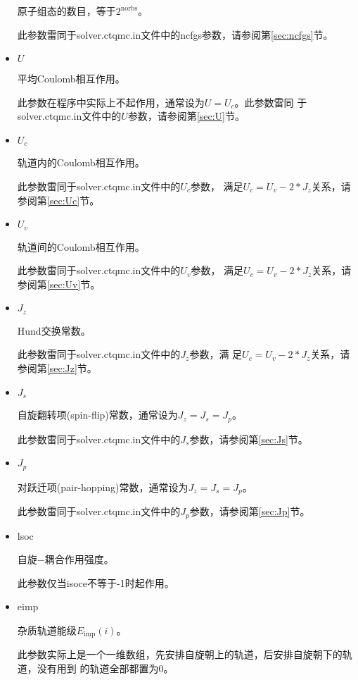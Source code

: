 \begin{itemize}
原子组态的数目，等于$2^{\text{norbs}}$。

此参数雷同于solver.ctqmc.in文件中的ncfgs参数，请参阅第\ref{sec:ncfgs}节。

\item {\color{red}$U$}

平均Coulomb相互作用。

此参数在程序中实际上不起作用，通常设为$U = U_{c}$。此参数雷同
于solver.ctqmc.in文件中的$U$参数，请参阅第\ref{sec:U}节。

\item {\color{red}$U_{c}$}

轨道内的Coulomb相互作用。

此参数雷同于solver.ctqmc.in文件中的$U_{c}$参数，
满足$U_{c} = U_{v} - 2*J_{z}$关系，请参阅第\ref{sec:Uc}节。

\item {\color{red}$U_{v}$}

轨道间的Coulomb相互作用。

此参数雷同于solver.ctqmc.in文件中的$U_{v}$参数，
满足$U_{c} = U_{v} - 2*J_{z}$关系，请参阅第\ref{sec:Uv}节。

\item {\color{red}$J_{z}$}

Hund交换常数。

此参数雷同于solver.ctqmc.in文件中的$J_{z}$参数，满
足$U_{c} = U_{v} - 2*J_{z}$关系，请参阅第\ref{sec:Jz}节。

\item {\color{red}$J_{s}$}

自旋翻转项(spin-flip)常数，通常设为$J_{z} = J_{s} = J_{p}$。

此参数雷同于solver.ctqmc.in文件中的$J_{s}$参数，请参阅第\ref{sec:Js}节。

\item {\color{red}$J_{p}$}

对跃迁项(pair-hopping)常数，通常设为$J_{z} = J_{s} = J_{p}$。

此参数雷同于solver.ctqmc.in文件中的$J_{p}$参数，请参阅第\ref{sec:Jp}节。

\item {\color{red}lsoc}

自旋$-$耦合作用强度。

此参数仅当isoce不等于-1时起作用。

\item {\color{red}eimp}

杂质轨道能级$E_{\text{imp}}(i)$。

此参数实际上是一个一维数组，先安排自旋朝上的轨道，后安排自旋朝下的轨道，没有用到
的轨道全部都置为0。

\end{itemize}

